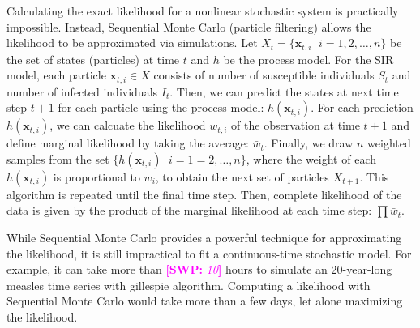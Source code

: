 \documentclass{article}
\newcommand{\comment}[3]{\textcolor{#1}{\textbf{[#2: }\textsl{#3}\textbf{]}}}
\newcommand{\swp}[1]{\comment{magenta}{SWP}{#1}}
\begin{document}
Calculating the exact likelihood for a nonlinear stochastic system is practically impossible.
Instead, Sequential Monte Carlo (particle filtering) allows the likelihood to be approximated via simulations.
Let $X_t = \{\mathbf{x}_{t, i} \,|\, i= 1, 2, \dots, n\}$ be the set of states (particles) at time $t$ and $h$ be the process model.
For the SIR model, each particle $\mathbf{x}_{t, i} \in X$ consists of number of susceptible individuals $S_t$ and number of infected individuals $I_t$.
Then, we can predict the states at next time step $t+1$ for each particle using the process model: $h(\mathbf{x}_{t, i})$.
For each prediction $h(\mathbf{x}_{t, i})$, we can calcuate the likelihood $w_{t,i}$ of the observation at time $t+1$ and define marginal likelihood by taking the average: $\bar{w}_t$.
Finally, we draw $n$ weighted samples from the set $\{h(\mathbf{x}_{t, i}) \,|\, i = 1=2, \dots, n\}$, where the weight of each $h(\mathbf{x}_{t, i})$ is proportional to $w_i$, to obtain the next set of particles $X_{t+1}$.
This algorithm is repeated until the final time step.
Then, complete likelihood of the data is given by the product of the marginal likelihood at each time step: $\prod \bar{w}_{t}$.

While Sequential Monte Carlo provides a powerful technique for approximating the likelihood, it is still impractical to fit a continuous-time stochastic model. 
For example, it can take more than \swp{10} hours to simulate an 20-year-long measles time series with gillespie algorithm. 
Computing a likelihood with Sequential Monte Carlo would take more than a few days, let alone maximizing the likelihood.
\end{document}
